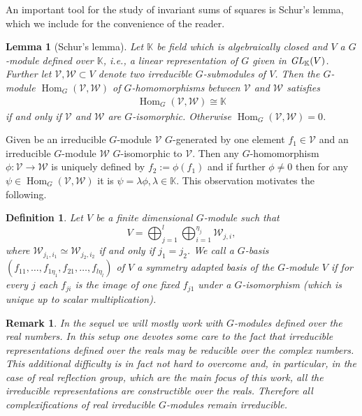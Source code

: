 \documentclass[11pt,a4paper]{amsart}
\numberwithin{equation}{section}
\newtheorem{lemma}[thm]{Lemma}
\newtheorem{definition}[thm]{Definition}
\newtheorem{remark}[thm]{Remark}
\theoremstyle{definition}
\newcommand{\K}{\mathbb{K}}
\DeclareMathOperator{\Hom}{Hom}
\numberwithin{thm}{section}
\theoremstyle{break}
\numberwithin{subcase}{case}
\begin{document}
An important tool for the study of invariant sums of squares is Schur's lemma, which we include for the convenience of the reader.
\begin{lemma}[Schur's lemma] \label{le:schur}
Let $\mathbb{K}$ be field which is algebraically closed and $V$ a $G$-module defined over $\mathbb{K}$, i.e., a linear representation of $G$ given in $\emph{GL}_\K(V)$. Further let $\mathcal{V},\mathcal{W} \subset V$ denote two irreducible $G$-submodules of $V$. Then the $G$-module $\Hom_G(\mathcal{V},\mathcal{W})$ of $G$-homomorphisms between $\mathcal{V}$ and $\mathcal{W}$ satisfies    
\begin{align*}
    \Hom_G(\mathcal{V},\mathcal{W}) \cong \K
\end{align*}
if and only if $\mathcal{V}$ and $\mathcal{W}$ are $G$-isomorphic. Otherwise $\Hom_G(\mathcal{V},\mathcal{W})=0$.
\end{lemma}

Given  be an irreducible $G$-module $\mathcal{V}$ $G$-generated by one element $f_1 \in \mathcal{V}$ and an  irreducible $G$-module $\mathcal{W}$  $G$-isomorphic to $\mathcal{V}$. Then any $G$-homomorphism $\phi : \mathcal{V} \rightarrow \mathcal{W}$ is uniquely defined by $f_2 := \phi(f_1)$ and if further $\phi \neq 0$ then for any $\psi \in \Hom_G(\mathcal{V},\mathcal{W})$ it is $\psi = \lambda \phi, \lambda \in \K$. This observation motivates the following.
\begin{definition}\label{def:SymmetryAdaptedbasis}
Let $V$ be a finite dimensional $G$-module such that $$V=\bigoplus_{j=1}^l\bigoplus_{i=1}^{\eta_j} \mathcal{W}_{j,i},$$
where $\mathcal{W}_{j_1,i_1}\simeq\mathcal{W}_{j_2,i_2}$ if and only if $j_1=j_2$. We call a $G$-basis $\left( f_{11},\ldots,f_{1\eta_1},f_{21},\ldots,f_{l\eta_l}\right)$ of $V$ a symmetry adapted basis of the $G$-module $V$ if for every $j$ 
each  $f_{ji}$ is  the image of one fixed $f_{j1}$ under a $G$-isomorphism (which is unique up to scalar multiplication). 
\end{definition}

\begin{remark}
In the sequel we will mostly work with $G$-modules defined over the real numbers. In this setup one devotes some care to the fact that irreducible representations defined over the reals may be reducible over the complex numbers. This additional difficulty is in fact not hard to overcome and, in particular, in the case of real reflection group, which are the main focus of this work, all the irreducible representations are constructible over the reals. Therefore all complexifications of real irreducible $G$-modules remain irreducible.
\end{remark}
\end{document}
